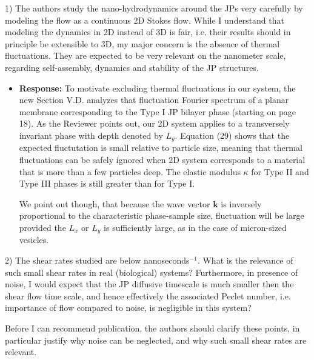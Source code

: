 \documentclass[11pt]{article}
\newcommand{\comment}[1]{{\color{blue} #1}}
\begin{document}
\noindent
\comment{1) The authors study the nano-hydrodynamics around the JPs very carefully by
modeling the flow as a continuous 2D Stokes flow. While I understand that
modeling the dynamics in 2D instead of 3D is fair, i.e. their results should in
principle be extensible to 3D, my major concern is the absence of thermal
fluctuations. They are expected to be very relevant on the nanometer scale,
regarding self-assembly, dynamics and stability of the JP structures.
}

\begin{itemize}
\item {\bf Response:}
  To motivate excluding thermal fluctuations in our system,
  the new Section V.D. 
  analyzes that fluctuation Fourier spectrum 
  of a planar membrane corresponding to the Type I JP bilayer phase
  (starting on page 18).
  As the Reviewer points out, our 2D system applies
  to a transversely invariant phase with depth denoted by $L_y$.
  Equation (29) shows that the expected fluctutation is small
  relative to particle size, meaning that thermal fluctuations can
  be safely ignored when 2D system corresponds to a material that 
  is more than a few particles deep.  The elastic modulus $\kappa$ for
  Type II and Type III phases is still greater than for Type I.

  We point out though, that because the wave vector $\mathbf{k}$ is inversely
  proportional to the characteristic phase-sample size,
  fluctuation will be large provided the $L_x$ or $L_y$ is sufficiently large,
  as in the case of micron-sized vesicles.
\end{itemize}

\noindent
\comment{2) The shear rates studied are below nanoseconds$^{-1}$. What is the relevance of
such small shear rates in real (biological) systems? Furthermore, in presence of
noise, I would expect that the JP diffusive timescale is much smaller then the
shear flow time scale, and hence effectively the associated Peclet number, i.e.
importance of flow compared to noise, is negligible in this system?

Before I can recommend publication, the authors should clarify these points, in
particular justify why noise can be neglected, and why such small shear rates
are relevant.}
\end{document}
